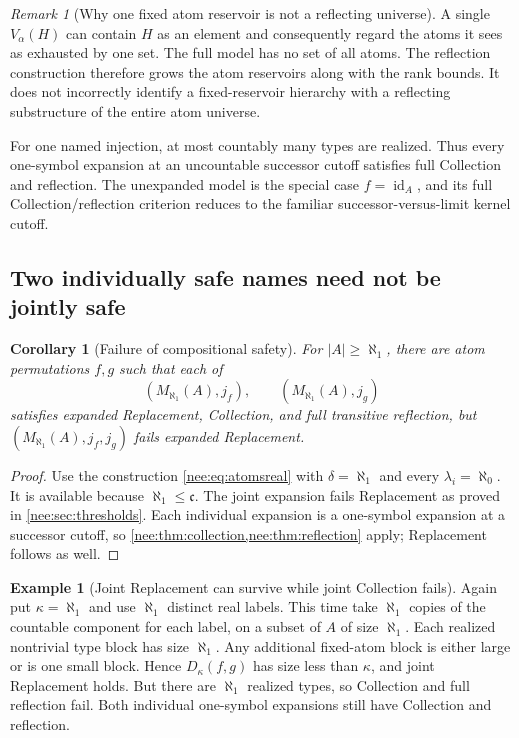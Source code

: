 \documentclass[11pt,letterpaper]{article}
\numberwithin{equation}{section}
\theoremstyle{plain}
\newtheorem{corollary}[corollary]{Corollary}
\theoremstyle{definition}
\newtheorem{example}[example]{Example}
\theoremstyle{remark}
\newtheorem{remark}[remark]{Remark}
\newcommand{\cont}{\mathfrak c}
\begin{document}
\begin{remark}[Why one fixed atom reservoir is not a reflecting universe]
A single $V_\alpha(H)$ can contain $H$ as an element and consequently regard the atoms it sees as exhausted by one set. The full model has no set of all atoms. The reflection construction therefore grows the atom reservoirs along with the rank bounds. It does not incorrectly identify a fixed-reservoir hierarchy with a reflecting substructure of the entire atom universe.
\end{remark}

For one named injection, at most countably many types are realized. Thus every one-symbol expansion at an uncountable successor cutoff satisfies full Collection and reflection. The unexpanded model is the special case $f=\operatorname{id}_A$, and its full Collection/reflection criterion reduces to the familiar successor-versus-limit kernel cutoff.

\subsection{Two individually safe names need not be jointly safe}
\begin{corollary}[Failure of compositional safety]\label{nee:cor:jointunsafe}
For $|A|\geq\aleph_1$, there are atom permutations $f,g$ such that each of
\[
(M_{\aleph_1}(A),j_f),\qquad (M_{\aleph_1}(A),j_g)
\]
satisfies expanded Replacement, Collection, and full transitive reflection, but $(M_{\aleph_1}(A),j_f,j_g)$ fails expanded Replacement.
\end{corollary}
\begin{proof}
Use the construction \eqref{nee:eq:atomsreal} with $\delta=\aleph_1$ and every $\lambda_i=\aleph_0$. It is available because $\aleph_1\leq\cont$. The joint expansion fails Replacement as proved in \cref{nee:sec:thresholds}. Each individual expansion is a one-symbol expansion at a successor cutoff, so \cref{nee:thm:collection,nee:thm:reflection} apply; Replacement follows as well.
\end{proof}

\begin{example}[Joint Replacement can survive while joint Collection fails]\label{nee:ex:jointcoll}
Again put $\kappa=\aleph_1$ and use $\aleph_1$ distinct real labels. This time take $\aleph_1$ copies of the countable component for each label, on a subset of $A$ of size $\aleph_1$. Each realized nontrivial type block has size $\aleph_1$. Any additional fixed-atom block is either large or is one small block. Hence $D_\kappa(f,g)$ has size less than $\kappa$, and joint Replacement holds. But there are $\aleph_1$ realized types, so Collection and full reflection fail. Both individual one-symbol expansions still have Collection and reflection.
\end{example}
\end{document}
